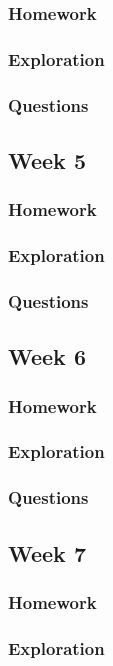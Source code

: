 \documentclass{article}
\theoremstyle{theorem}
\theoremstyle{definition}
\theoremstyle{remark}
\begin{document}
\subsubsection{Homework}
\subsubsection{Exploration}
\subsubsection{Questions}

\subsection{Week 5}
\subsubsection{Homework}
\subsubsection{Exploration}
\subsubsection{Questions}

\subsection{Week 6}
\subsubsection{Homework}
\subsubsection{Exploration}
\subsubsection{Questions}

\subsection{Week 7}
\subsubsection{Homework}
\subsubsection{Exploration}
\end{document}

